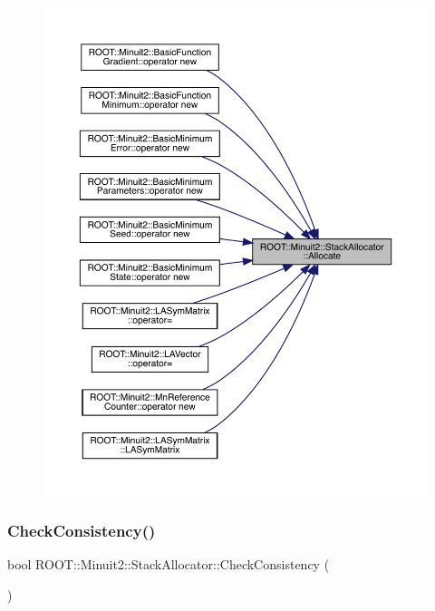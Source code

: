 \begin{figure}[H]
\begin{center}
\leavevmode
\includegraphics[width=350pt]{d3/d1e/classROOT_1_1Minuit2_1_1StackAllocator_a1fb4d1744055446776080af229679e03_icgraph}
\end{center}
\end{figure}
\mbox{\label{classROOT_1_1Minuit2_1_1StackAllocator_ad1189cdc76a07c36ef1924ad2488797d}} 
\subsubsection{\texorpdfstring{CheckConsistency()}{CheckConsistency()}\hspace{0.1cm}{\footnotesize\ttfamily [1/3]}}
{\footnotesize\ttfamily bool R\+O\+O\+T\+::\+Minuit2\+::\+Stack\+Allocator\+::\+Check\+Consistency (\begin{DoxyParamCaption}{ }\end{DoxyParamCaption})\hspace{0.3cm}{\ttfamily [inline]}}


